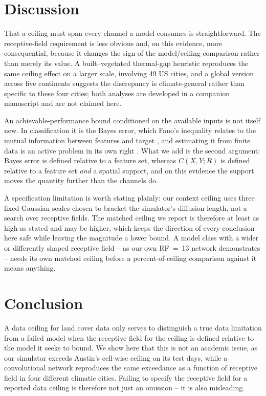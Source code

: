 \section{Discussion}

That a ceiling must span every channel a model consumes is straightforward. The receptive-field requirement is less obvious and, on this evidence, more consequential, because it changes the sign of the model/ceiling comparison rather than merely its value. A built--vegetated thermal-gap heuristic reproduces the same ceiling effect on a larger scale, involving 49 US cities, and a global version across five continents suggests the discrepancy is climate-general rather than specific to these four cities; both analyses are developed in a companion manuscript and are not claimed here.

An achievable-performance bound conditioned on the available inputs is not itself new. In classification it is the Bayes error, which Fano's inequality relates to the mutual information between features and target \cite{cover2006elements}, and estimating it from finite data is an active problem in its own right \cite{noshad2019learning}. What we add is the second argument: Bayes error is defined relative to a feature set, whereas $C(X,Y;R)$ is defined relative to a feature set \emph{and} a spatial support, and on this evidence the support moves the quantity further than the channels do.

A specification limitation is worth stating plainly: our context ceiling uses three fixed Gaussian scales chosen to bracket the simulator's diffusion length, not a search over receptive fields. The matched ceiling we report is therefore at least as high as stated and may be higher, which keeps the direction of every conclusion here safe while leaving the magnitude a lower bound. A model class with a wider or differently shaped receptive field -- as our own RF~=~13 network demonstrates -- needs its own matched ceiling before a percent-of-ceiling comparison against it means anything.

\section{Conclusion}

A data ceiling for land cover data only serves to distinguish a true data limitation from a failed model when the receptive field for the ceiling is defined relative to the model it seeks to bound. We show here that this is not an academic issue, as our simulator exceeds Austin's cell-wise ceiling on its test days, while a convolutional network reproduces the same exceedance as a function of receptive field in four different climatic cities. Failing to specify the receptive field for a reported data ceiling is therefore not just an omission -- it is also misleading.

